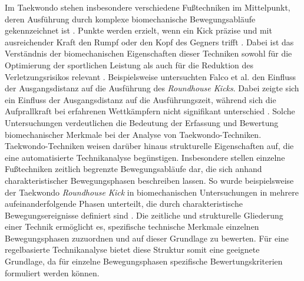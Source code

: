 \documentclass[intern]{cgMA}
\begin{document}
Im Taekwondo stehen insbesondere verschiedene Fußtechniken im Mittelpunkt, deren Ausführung durch komplexe biomechanische Bewegungsabläufe gekennzeichnet ist \cite{YilmazAtes2025}. Punkte werden erzielt, wenn ein Kick präzise und mit ausreichender Kraft den Rumpf oder den Kopf des Gegners trifft \cite{Falco2009}. Dabei ist das Verständnis der biomechanischen Eigenschaften dieser Techniken sowohl für die Optimierung der sportlichen Leistung als auch für die Reduktion des Verletzungsrisikos relevant \cite{YilmazAtes2025}. Beispielsweise untersuchten Falco et al. \cite{Falco2009} den Einfluss der Ausgangsdistanz auf die Ausführung des \textit{Roundhouse Kicks}. Dabei zeigte sich ein Einfluss der Ausgangsdistanz auf die Ausführungszeit, während sich die Aufprallkraft bei erfahrenen Wettkämpfern nicht signifikant unterschied \cite{Falco2009}. Solche Untersuchungen verdeutlichen die Bedeutung der Erfassung und Bewertung biomechanischer Merkmale bei der Analyse von Taekwondo-Techniken.
Taekwondo-Techniken weisen darüber hinaus strukturelle Eigenschaften auf, die eine automatisierte Technikanalyse begünstigen. Insbesondere stellen einzelne Fußtechniken zeitlich begrenzte Bewegungsabläufe dar, die sich anhand charakteristischer Bewegungsphasen beschreiben lassen. So wurde beispielsweise der Taekwondo \textit{Roundhouse Kick} in biomechanischen Untersuchungen in mehrere aufeinanderfolgende Phasen unterteilt, die durch charakteristische Bewegungsereignisse definiert sind \cite{Gavagan2017}. Die zeitliche und strukturelle Gliederung einer Technik ermöglicht es, spezifische technische Merkmale einzelnen Bewegungsphasen zuzuordnen und auf dieser Grundlage zu bewerten. Für eine regelbasierte Technikanalyse bietet diese Struktur somit eine geeignete Grundlage, da für einzelne Bewegungsphasen spezifische Bewertungskriterien formuliert werden können.
\end{document}
